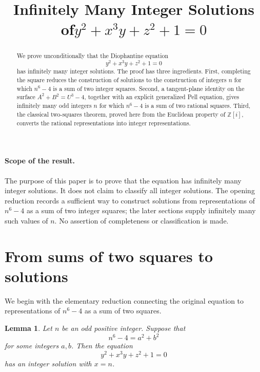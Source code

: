 \documentclass[11pt]{article}
\title{Infinitely Many Integer Solutions of\texorpdfstring{\(y^2+x^3y+z^2+1=0\)}{y2+x3y+z2+1=0}}
\author{}
\date{}
\newtheorem{lemma}[theorem]{Lemma}
\theoremstyle{remark}
\begin{document}
\maketitle

\begin{abstract}
We prove unconditionally that the Diophantine equation
\[
        y^2+x^3y+z^2+1=0
\]
has infinitely many integer solutions.  The proof has three ingredients.  First,
completing the square reduces the construction of solutions to the construction
of integers \(n\) for which \(n^6-4\) is a sum of two integer squares.  Second,
a tangent-plane identity on the surface \(A^2+B^2=U^3-4\), together with an
explicit generalized Pell equation, gives infinitely many odd integers \(n\)
for which \(n^6-4\) is a sum of two rational squares.  Third, the classical
two-squares theorem, proved here from the Euclidean property of \(\mathbb Z[i]\),
converts the rational representations into integer representations.

\end{abstract}

\paragraph{Scope of the result.}
The purpose of this paper is to prove that the equation has infinitely many
integer solutions.  It does not claim to classify all integer solutions.  The
opening reduction records a sufficient way to construct solutions from
representations of \(n^6-4\) as a sum of two integer squares; the later sections
supply infinitely many such values of \(n\).  No assertion of completeness or
classification is made.

\section{From sums of two squares to solutions}

We begin with the elementary reduction connecting the original equation to
representations of \(n^6-4\) as a sum of two squares.

\begin{lemma}\label{lem:squares-to-solutions}
Let \(n\) be an odd positive integer.  Suppose that
\[
        n^6-4=a^2+b^2
\]
for some integers \(a,b\).  Then the equation
\[
        y^2+x^3y+z^2+1=0
\]
has an integer solution with \(x=n\).
\end{lemma}
\end{document}
